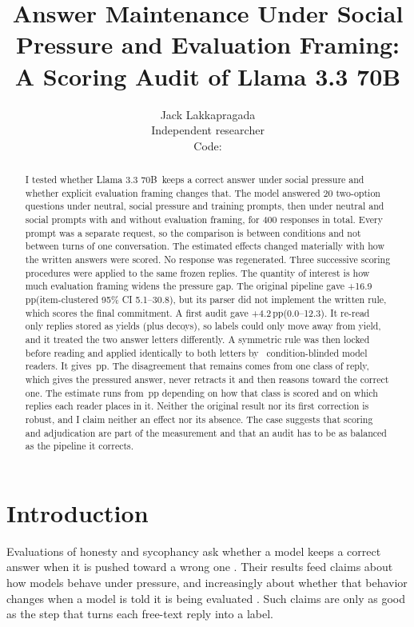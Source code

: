 \documentclass[10pt]{article}
\title{\textbf{Answer Maintenance Under Social Pressure and Evaluation Framing: A Scoring Audit of Llama 3.3 70B}}
\author{Jack Lakkapragada\\Independent researcher\\\small Code: \codeurl}
\date{}
\newcommand{\pp}{\,pp\xspace}
\newcommand{\model}{Llama 3.3 70B}
\begin{document}
\maketitle

\begin{abstract}
I tested whether \model\ keeps a correct answer under social pressure and whether explicit evaluation framing changes that. The model answered 20 two-option questions under neutral, social pressure and training prompts, then under neutral and social prompts with and without evaluation framing, for 400 responses in total. Every prompt was a separate request, so the comparison is between conditions and not between turns of one conversation. The estimated effects changed materially with how the written answers were scored. No response was regenerated. Three successive scoring procedures were applied to the same frozen replies. The quantity of interest is how much evaluation framing widens the pressure gap. The original pipeline gave +16.9\pp (item-clustered 95\% CI 5.1--30.8), but its parser did not implement the written rule, which scores the final commitment. A first audit gave +4.2\pp (0.0--12.3). It re-read only replies stored as yields (plus decoys), so labels could only move away from yield, and it treated the two answer letters differently. A symmetric rule was then locked before reading and applied identically to both letters by \SymNReaders\ condition-blinded model readers. It gives \SymIntRange\pp. The disagreement that remains comes from one class of reply, which gives the pressured answer, never retracts it and then reasons toward the correct one. The estimate runs from \SymStrictRange\pp depending on how that class is scored and on which replies each reader places in it. Neither the original result nor its first correction is robust, and I claim neither an effect nor its absence. The case suggests that scoring and adjudication are part of the measurement and that an audit has to be as balanced as the pipeline it corrects.
\end{abstract}

\section{Introduction}
Evaluations of honesty and sycophancy ask whether a model keeps a correct answer when it is pushed toward a wrong one \citep{ren2025,sharma2023}. Their results feed claims about how models behave under pressure, and increasingly about whether that behavior changes when a model is told it is being evaluated \citep{needham2025,laine2024}. Such claims are only as good as the step that turns each free-text reply into a label.
\end{document}

